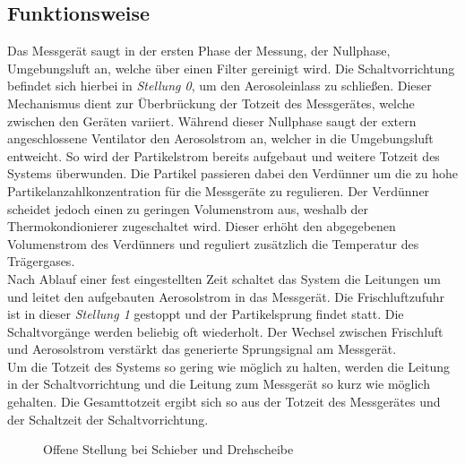 \subsection{Funktionsweise}
Das Messger\"{a}t saugt in der ersten Phase der Messung, der Nullphase, Umgebungsluft an, welche \"{u}ber einen Filter gereinigt wird. Die Schaltvorrichtung befindet sich hierbei in \textit{Stellung 0}, um den Aerosoleinlass zu schlie{\ss}en. Dieser Mechanismus dient zur \"{U}berbr\"{u}ckung der Totzeit des Messger\"{a}tes, welche zwischen den Ger\"{a}ten variiert. W\"{a}hrend dieser Nullphase saugt der extern angeschlossene Ventilator den Aerosolstrom an, welcher in die Umgebungsluft entweicht. So wird der Partikelstrom bereits aufgebaut und weitere Totzeit des Systems \"{u}berwunden. Die Partikel passieren dabei den Verd\"{u}nner um die zu hohe Partikelanzahlkonzentration f\"{u}r die Messger\"{a}te zu regulieren.  Der Verd\"{u}nner scheidet jedoch einen zu geringen Volumenstrom aus, weshalb der Thermokondionierer zugeschaltet wird. Dieser erh\"{o}ht den abgegebenen Volumenstrom des Verd\"{u}nners und reguliert zus\"{a}tzlich die Temperatur des Tr\"{a}gergases\cite{candle}.\\
Nach Ablauf einer fest eingestellten Zeit schaltet das System die Leitungen um und leitet den aufgebauten Aerosolstrom in das Messger\"{a}t. Die Frischluftzufuhr ist in dieser \textit{Stellung 1} gestoppt und der Partikelsprung findet statt. Die Schaltvorg\"{a}nge werden beliebig oft wiederholt. Der Wechsel zwischen Frischluft und Aerosolstrom verst\"{a}rkt das generierte Sprungsignal am Messger\"{a}t.\\
Um die Totzeit des Systems so gering wie m\"{o}glich zu halten, werden die Leitung in der Schaltvorrichtung und die Leitung zum Messger\"{a}t so kurz wie m\"{o}glich gehalten. Die Gesamttotzeit ergibt sich so aus der Totzeit des Messger\"{a}tes und der Schaltzeit der Schaltvorrichtung.
\begin{figure}[H]
        \myfloatalign
         \quad
        \caption[Offene Stellung bei Schieber und Drehscheibe]
        {Offene Stellung bei Schieber und Drehscheibe}
        \label{fig:concepts_4_on}
\end{figure}